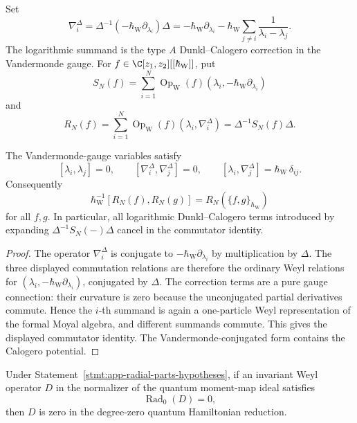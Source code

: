\begin{defn}
\label{def:app-radial-vandermonde-gauge-variables}
  Set
  \[
    \nabla_i^\Delta
      =
      \Delta^{-1}(-\hbar_{\mathrm{W}}\partial_{\lambda_i})\Delta
      =
      -\hbar_{\mathrm{W}}\partial_{\lambda_i}
      -\hbar_{\mathrm{W}}\sum_{j\neq i}\frac{1}{\lambda_i-\lambda_j}.
  \]
  The logarithmic summand is the type \(A\) Dunkl--Calogero correction
  in the Vandermonde gauge.  For \(f\in\C[z_1,z_2][[\hbar_{\mathrm{W}}]]\), put
  \[
    S_N(f)=\sum_{i=1}^N
      \operatorname{Op}_{\mathrm W}
      (f)(\lambda_i,-\hbar_{\mathrm{W}}\partial_{\lambda_i})
  \]
  and
  \[
    R_N(f)=
      \sum_{i=1}^N
      \operatorname{Op}_{\mathrm W}
      (f)(\lambda_i,\nabla_i^\Delta)
      =
      \Delta^{-1}S_N(f)\Delta .
  \]
\end{defn}

\begin{lem}
\label{lem:app-radial-dunkl-calogero-cancellation}
  The Vandermonde-gauge variables satisfy
  \[
    [\lambda_i,\lambda_j]=0,\qquad
    [\nabla_i^\Delta,\nabla_j^\Delta]=0,\qquad
    [\lambda_i,\nabla_j^\Delta]=\hbar_{\mathrm{W}}\,\delta_{ij}.
  \]
  Consequently
  \[
    \hbar_{\mathrm{W}}^{-1}[R_N(f),R_N(g)]=R_N(\{f,g\}_{\hbar_{\mathrm{W}}})
  \]
  for all \(f,g\).  In particular, all logarithmic
  Dunkl--Calogero terms introduced by expanding
  \(\Delta^{-1}S_N(-)\Delta\) cancel in the commutator identity.
\end{lem}

\begin{proof}
  The operator \(\nabla_i^\Delta\) is conjugate to
  \(-\hbar_{\mathrm{W}}\partial_{\lambda_i}\) by multiplication by \(\Delta\).
  The three displayed commutation relations are therefore the ordinary
  Weyl relations for
  \((\lambda_i,-\hbar_{\mathrm{W}}\partial_{\lambda_i})\), conjugated by
  \(\Delta\).  The correction terms are a pure gauge connection:
  their curvature is zero because the unconjugated partial derivatives
  commute.  Hence the \(i\)-th summand is again a one-particle Weyl
  representation of the formal Moyal algebra, and different summands
  commute.  This gives the displayed commutator identity.  The
  Vandermonde-conjugated form contains the Calogero potential.
\end{proof}

\begin{lem}
\label{lem:app-radial-map-injectivity}
  Under Statement~\ref{stmt:app-radial-parts-hypotheses}, if an invariant
  Weyl operator \(D\) in the normalizer of the quantum moment-map ideal
  satisfies
  \[
    \operatorname{Rad}_0(D)=0,
  \]
  then \(D\) is zero in the degree-zero quantum Hamiltonian reduction.
\end{lem}

